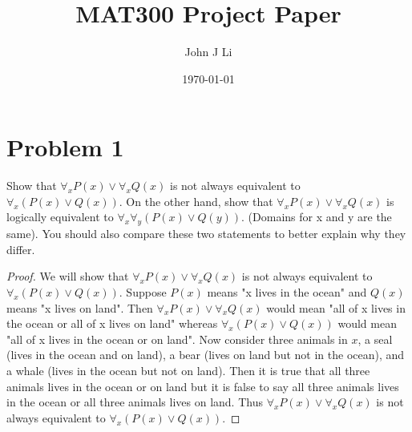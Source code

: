 \documentclass{article}
\title{MAT300 Project Paper}
\date{\today}
\author{John J Li}
\begin{document}
    \maketitle
    \thispagestyle{empty}


    \section*{Problem 1}

    Show that $\forall_x P(x)\lor \forall_x Q(x)$ is not always equivalent to $\forall_x (P(x)\lor Q(x))$. On the other hand, show that $\forall_x P(x) \lor \forall_x Q(x)$ is logically equivalent to $\forall_x\forall_y (P(x)\lor Q(y))$. (Domains for x and y are the same). You should also compare these two statements to better explain why they differ.
    \begin{proof}
        We will show that $\forall_x P(x)\lor \forall_x Q(x)$ is not always equivalent to $\forall_x (P(x)\lor Q(x))$. Suppose $P(x)$ means "x lives in the ocean" and $Q(x)$ means "x lives on land". Then $\forall_x P(x)\lor \forall_x Q(x)$ would mean "all of x lives in the ocean or all of x lives on land" whereas $\forall_x(P(x)\lor Q(x))$ would mean "all of x lives in the ocean or on land". Now consider three animals in $x$, a seal (lives in the ocean and on land), a bear (lives on land but not in the ocean), and a whale (lives in the ocean but not on land). Then it is true that all three animals lives in the ocean or on land but it is false to say all three animals lives in the ocean or all three animals lives on land. Thus $\forall_x P(x)\lor \forall_x Q(x)$ is not always equivalent to $\forall_x (P(x)\lor Q(x))$.
    \end{proof}
\end{document}

